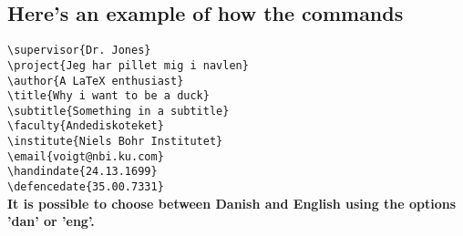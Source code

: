 \subsection*{Here's an example of how the commands}

\noindent \verb|\supervisor{Dr. Jones}|\\
\verb|\project{Jeg har pillet mig i navlen}|\\
\verb|\author{A LaTeX enthusiast}|\\
\verb|\title{Why i want to be a duck}|\\
\verb|\subtitle{Something in a subtitle}|\\
\verb|\faculty{Andediskoteket}|\\
\verb|\institute{Niels Bohr Institutet}|\\
\verb|\email{voigt@nbi.ku.com}|\\
\verb|\handindate{24.13.1699}|\\
\verb|\defencedate{35.00.7331}|\\

\textbf{It is possible to choose between Danish and English using the options 'dan' or 'eng'.}

